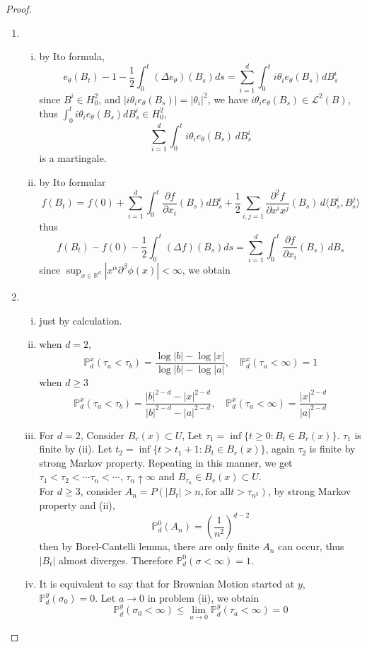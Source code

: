 \documentclass{article}     %
\begin{document}
\begin{proof}
\begin{enumerate}[(1)]
\item 
\begin{enumerate}[(i)]
    \item by Ito formula,
 \[e_{\theta}(B_t)-1-\frac{1}{2}\int_{0}^t (\Delta e_{\theta})(B_s)ds=\sum_{i=1}^d\int_0^t i\theta_i e_{\theta}(B_s)dB^i_s\]
 since $B^i \in H_0^2$, and $|i\theta_ie_{\theta}(B_s)|=|\theta_i|^2$, we have $i\theta_ie_{\theta}(B_s)\in \mathcal{L}^2(B)$, thus $\int_0^t i\theta_i e_{\theta}(B_s)dB^i_s \in H_0^2$, 
 \[\sum_{i=1}^d\int_0^t i\theta_i e_{\theta}(B_s)\,dB^i_s\]
 is a martingale.
 \item by Ito formular 
 \[f(B_t)=f(0)+\sum_{i=1}^d\int_0^t\frac{\partial f}{\partial x_i}(B_s)dB^i_s+\frac{1}{2}\sum_{i,j=1}\frac{\partial^2 f}{\partial x^ix^j}(B_s)\,d \langle B^i_s,B^j_s\rangle\]
 thus 
 \[f(B_t)-f(0)-\frac{1}{2}\int_0^t(\Delta f)(B_s)ds=\sum_{i=1}^d\int_0^t \frac{\partial f}{\partial x_i}(B_s)\,dB_s\]
 since $\sup_{x\in \mathbb{R}^d}|x^{\alpha}\partial^{\beta}\phi(x)|<\infty$, we obtain 

\end{enumerate}
\item \begin{enumerate}[(i)]
    \item just by calculation.
    \item when $d=2$, 
    \[\mathbb{P}_d^x(\tau_a<\tau_b)=\frac{\log|b|-\log|x|}{\log|b|-\log|a|},\quad \mathbb{P}_d^x(\tau_a<\infty)=1\]
    when $d\geq 3$
    \[\mathbb{P}_d^x(\tau_a<\tau_b)=\frac{|b|^{2-d}-|x|^{2-d}}{|b|^{2-d}-|a|^{2-d}},\quad \mathbb{P}_d^x(\tau_a<\infty)=\frac{|x|^{2-d}} {|a|^{2-d}}\]
    
    
    \item  For $d=2$, Consider $B_r(x)\subset U$, Let $\tau_1=\inf \{t\geq 0: B_t\in B_r(x)\}$. $\tau_1$ is finite by (ii). Let $t_2=\inf\{t>t_1+1: B_t\in B_r(x)\}$, again $\tau_2$ is finite by strong Markov property. Repeating in this manner, we get $\tau_1<\tau_2<\cdots \tau_n<\cdots$, $\tau_n\uparrow \infty$  and $B_{\tau_n}\in B_r(x)\subset U$.
    \\
    For $d\geq 3$, consider $A_n=P(|B_t|>n, \text{for all} t >\tau_{n^3})$, by strong Markov property and (ii), 
    \[\mathbb{P}_d^0(A_n)=(\frac{1}{n^2})^{d-2}\]
    then by Borel-Cantelli lemma, there are only finite $A_n$ can occur, thus $|B_t|$ almost diverges. Therefore $\mathbb{P}_d^0(\sigma<\infty)=1$.
    
    
 
     
       \item It is equivalent to say that for Brownian Motion started at $y$, $\mathbb{P}^{y}_d(\sigma_0)=0$. Let $a\rightarrow 0$ in problem (ii), we obtain
       \[\mathbb{P}^{y}_d(\sigma_0<\infty)\leq \lim_{a\rightarrow 0}\mathbb{P}_d^y(\tau_a<\infty)=0\]

    \end{enumerate}

\end{enumerate}
\end{proof}
\end{document}

